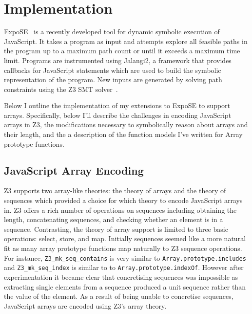 \documentclass[]{final_report}
\begin{document}
\chapter{Implementation} \label{sec:implementation}

ExpoSE~\cite{Loring_2017} is a recently developed tool for dynamic symbolic execution of JavaScript. It takes a program as input and attempts explore all feasible paths in the program up to a maximum path count or until it exceeds a maximum time limit. Programs are instrumented using Jalangi2, a framework that provides callbacks for JavaScript statements which are used to build the symbolic representation of the program. New inputs are generated by solving path constraints using the Z3 SMT solver~\cite{de2008z3}.

Below I outline the implementation of my extensions to ExpoSE to support arrays. Specifically, below I'll describe the challenges in encoding JavaScript arrays in Z3, the modifications necessary to symbolically reason about arrays and their length, and the a description of the function models I've written for Array prototype functions.

\section{JavaScript Array Encoding}
Z3 supports two array-like theories: the theory of arrays and the theory of sequences which provided a choice for which theory to encode JavaScript arrays in. Z3 offers a rich number of operations on sequences including obtaining the length, concatenating sequences, and checking whether an element is in a sequence. Contrasting, the theory of array support is limited to three basic operations: select, store, and map. Initially sequences seemed like a more natural fit as many array prototype functions map naturally to Z3 sequence operations. For instance, \lstinline{Z3_mk_seq_contains} is very similar to \lstinline{Array.prototype.includes} and \lstinline{Z3_mk_seq_index} is similar to to \lstinline{Array.prototype.indexOf}. However after experimentation it became clear that concretising sequences was impossible as extracting single elements from a sequence produced a unit sequence rather than the value of the element. As a result of being unable to concretise sequences, JavaScript arrays are encoded using Z3’s array theory. 
\end{document}
